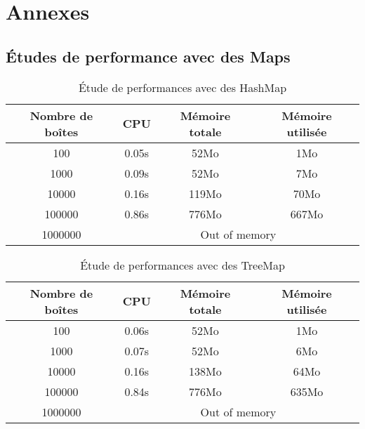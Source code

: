 \appendix
\chapter{Annexes}
\section{Études de performance avec des Maps}

\begin{table}[htpb]
  \centering
\begin{tabular}{|c|c|c|c|}
\hline
Nombre de boîtes & CPU & Mémoire totale & Mémoire utilisée\\
\hline
100 & 0.05s & 52Mo & 1Mo\\
\hline
1000 & 0.09s & 52Mo & 7Mo\\
\hline
10000 & 0.16s & 119Mo & 70Mo\\
\hline
100000 & 0.86s & 776Mo & 667Mo\\
\hline
1000000 & \multicolumn{3}{|c|}{Out of memory}\\
\hline
\end{tabular}
\caption{Étude de performances avec des HashMap}
\label{tab:hashmap1}
\end{table}

\begin{table}[htbp]
  \centering
\begin{tabular}{|c|c|c|c|}
\hline
Nombre de boîtes & CPU & Mémoire totale & Mémoire utilisée\\
\hline
100 & 0.06s & 52Mo & 1Mo\\
\hline
1000 & 0.07s & 52Mo & 6Mo\\
\hline
10000 & 0.16s & 138Mo & 64Mo\\
\hline
100000 & 0.84s & 776Mo & 635Mo\\
\hline
1000000 & \multicolumn{3}{|c|}{Out of memory}\\
\hline
\end{tabular}
\caption{Étude de performances avec des TreeMap}
\label{tab:treemap1}
\end{table}


